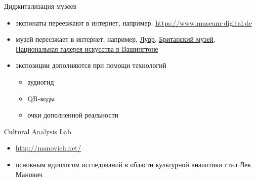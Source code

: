 \documentclass[13pt, t]{beamer}
\begin{document}
\begin{frame}{Диджитализация музеев}
\begin{itemize}
\item экспонаты переезжают в интернет, например, \href{https://www.museum-digital.de}{https://www.museum-digital.de}
\item музей переезжает в интернет, например, \href{http://www.louvre.fr/en/visites-en-ligne\#tabs}{Лувр}, \href{http://www.britishmuseum.org/with_google.aspx}{Британский музей}, \href{http://www.nga.gov/exhibitions/webtours.htm}{Национальная галерея искусства в Вашингтоне}
\item экспозиции дополняются при помощи технологий
\begin{itemize}
\item аудиогид
\item QR-коды
\item очки дополненной реальности
\end{itemize}
\end{itemize}
\end{frame}



\begin{frame}{Cultural Analysis Lab}
\begin{itemize}
\item \href{http://manovich.net/}{\alert {http://manovich.net/}}
\item  основным идиологом исследований в области культурной аналитики стал Лев Манович
\end{itemize}
\end{frame}

\end{document}
